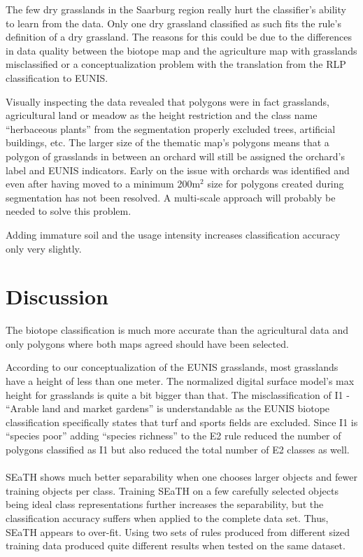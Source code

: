 \documentclass[authoryear, review,12pt,number]{elsarticle}
\begin{document}
The few dry grasslands in the Saarburg region really hurt the classifier's 
ability to learn from the data. Only one dry grassland classified as such fits 
the rule's definition of a dry grassland. The reasons for this could be due to 
the differences in data quality between the biotope map and the agriculture map 
with grasslands misclassified or a conceptualization problem with the 
translation from the RLP classification to EUNIS. 

Visually inspecting the data revealed that polygons were in fact grasslands, 
agricultural land or meadow as the height restriction and the class name 
``herbaceous plants'' from the segmentation properly excluded trees, artificial 
buildings, etc. The larger size of the thematic map's 
polygons means that a polygon of grasslands in between an orchard will still be 
assigned the orchard's label and EUNIS indicators. Early on the issue with
orchards was identified and even after having moved to a minimum 200m$^{2}$ size for
polygons created during segmentation has not been resolved. A multi-scale
approach will probably be needed to solve this problem.

Adding immature soil and the usage intensity increases classification accuracy 
only very slightly.

\section{Discussion}


The biotope classification is much more 
accurate than the agricultural data and only polygons where both maps agreed 
should have been selected.

According to our conceptualization of the EUNIS grasslands, most grasslands 
have a height of less than one meter. The normalized digital surface model's 
max height for grasslands is quite a bit bigger than that.
The misclassification of I1 - ``Arable land and market gardens'' is 
understandable as the EUNIS biotope classification specifically states that 
turf and sports fields are excluded. Since I1 is ``species poor'' adding 
``species richness'' to the E2 rule reduced the number of polygons classified 
as I1 but also reduced the total number of E2 classes as well.\\
\\
SEaTH shows much better separability when one chooses
larger objects and fewer training objects per class. Training SEaTH on a few
carefully selected objects being ideal class representations further increases
the separability, but the classification accuracy suffers when applied to the
complete data set. Thus, SEaTH appears to over-fit. Using two sets of rules 
produced from different sized training data produced quite different results 
when tested on the same dataset. 
\\
\end{document}
